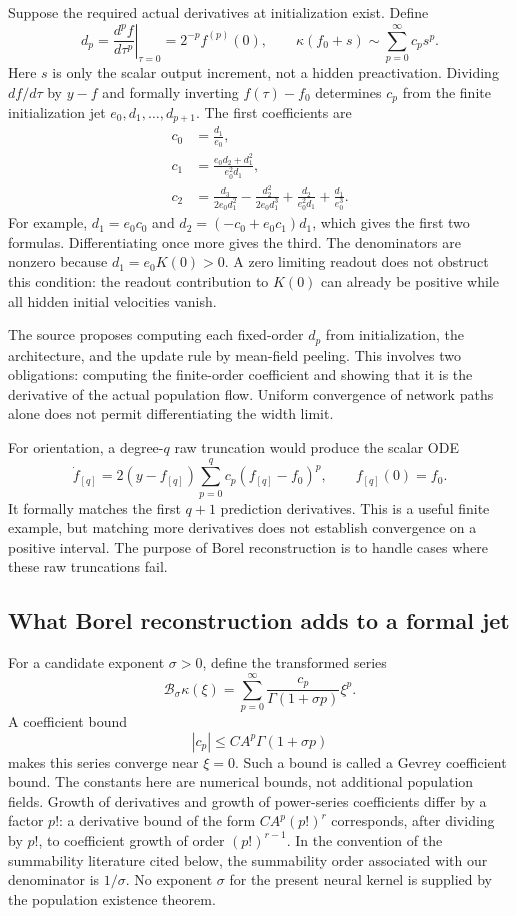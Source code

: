 Suppose the required actual derivatives at initialization exist.  Define
\[
 d_p=\left.\frac{d^p f}{d\tau^p}\right|_{\tau=0}
     =2^{-p}f^{(p)}(0),
 \qquad
 \kappa(f_0+s)\sim\sum_{p=0}^{\infty}c_p s^p.
\]
Here $s$ is only the scalar output increment, not a hidden preactivation.
Dividing $df/d\tau$ by $y-f$ and formally inverting $f(\tau)-f_0$ determines
$c_p$ from the finite initialization jet $e_0,d_1,\ldots,d_{p+1}$.  The first
coefficients are
\begin{align*}
 c_0&=\frac{d_1}{e_0},\\
 c_1&=\frac{e_0d_2+d_1^2}{e_0^2d_1},\\
 c_2&=\frac{d_3}{2e_0d_1^2}
       -\frac{d_2^2}{2e_0d_1^3}
       +\frac{d_2}{e_0^2d_1}
       +\frac{d_1}{e_0^3}.
\end{align*}
For example, $d_1=e_0c_0$ and
$d_2=(-c_0+e_0c_1)d_1$, which gives the first two formulas.  Differentiating
once more gives the third.  The denominators are nonzero because
$d_1=e_0K(0)>0$.  A zero limiting readout does not obstruct this condition:
the readout contribution to $K(0)$ can already be positive while all hidden
initial velocities vanish.

The source proposes computing each fixed-order $d_p$ from initialization,
the architecture, and the update rule by mean-field peeling.  This involves
two obligations: computing the finite-order coefficient and showing that it
is the derivative of the actual population flow.  Uniform convergence of
network paths alone does not permit differentiating the width limit.

For orientation, a degree-$q$ raw truncation would produce the scalar ODE
\[
 \dot f_{[q]}=2(y-f_{[q]})
       \sum_{p=0}^{q}c_p(f_{[q]}-f_0)^p,
 \qquad f_{[q]}(0)=f_0.
\]
It formally matches the first $q+1$ prediction derivatives.  This is a
useful finite example, but matching more derivatives does not establish
convergence on a positive interval.  The purpose of Borel reconstruction is
to handle cases where these raw truncations fail.

\subsection{What Borel reconstruction adds to a formal jet}
\label{app:borel-conditions}

For a candidate exponent $\sigma>0$, define the transformed series
\[
 \mathcal B_\sigma\kappa(\xi)
 =\sum_{p=0}^{\infty}
   \frac{c_p}{\Gamma(1+\sigma p)}\xi^p.
\]
A coefficient bound
\[
 |c_p|\le C A^p\Gamma(1+\sigma p)
\]
makes this series converge near $\xi=0$.  Such a bound is called a Gevrey
coefficient bound.  The constants here are numerical bounds, not additional
population fields.  Growth of derivatives and growth of power-series
coefficients differ by a factor $p!$: a derivative bound of the form
$C A^p(p!)^r$ corresponds, after dividing by $p!$, to coefficient growth
of order $(p!)^{r-1}$.  In the convention of the summability literature
cited below, the summability order associated with our denominator is
$1/\sigma$.  No exponent $\sigma$ for the present neural kernel is supplied
by the population existence theorem.

